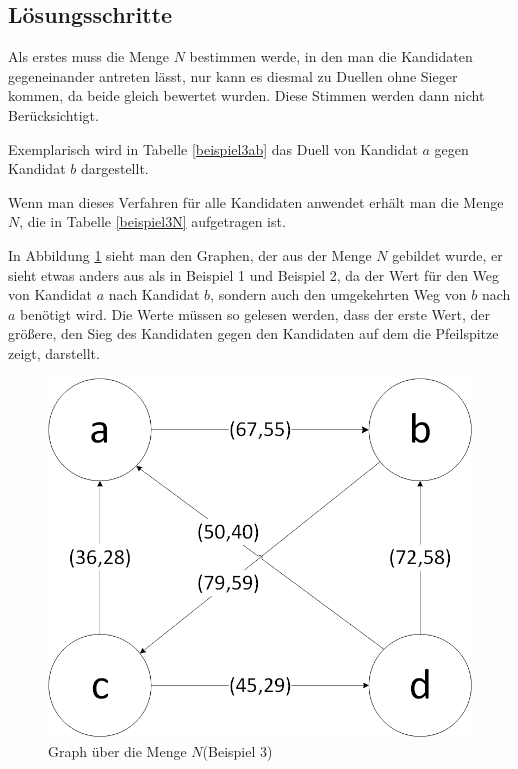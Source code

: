 \subsection{Lösungsschritte} 
\label{sec:loesungen3}
Als erstes muss die Menge $N$ bestimmen werde, in den man die Kandidaten gegeneinander antreten lässt, nur kann es diesmal zu Duellen ohne Sieger kommen, da beide gleich bewertet wurden. Diese Stimmen werden dann nicht Berücksichtigt. 

Exemplarisch wird in Tabelle \ref{beispiel3ab} das Duell von Kandidat $a$ gegen Kandidat $b$ dargestellt. 




Wenn man dieses Verfahren für alle Kandidaten anwendet erhält man die Menge $N$, die in Tabelle \ref{beispiel3N} aufgetragen ist.



In Abbildung \ref{fig:graph3} sieht man den Graphen, der aus der Menge $N$ gebildet wurde, er sieht etwas anders aus als in Beispiel 1 und Beispiel 2, da der Wert für den Weg von Kandidat $a$ nach Kandidat $b$, sondern auch den umgekehrten Weg von $b$ nach $a$ benötigt wird. Die Werte müssen so gelesen werden, dass der erste Wert, der größere, den Sieg des Kandidaten gegen den Kandidaten auf dem die Pfeilspitze zeigt, darstellt.

\begin{figure}[!h]
\centering
\includegraphics[scale=0.5]{Bilder/Beispiel3_Graph.png}
\caption{Graph über die Menge $N$(Beispiel 3)}
\label{fig:graph3}
\end{figure}

